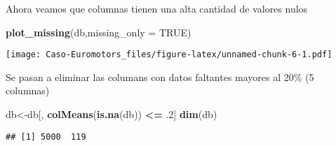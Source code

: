 \documentclass[
]{article}
\newenvironment{Shaded}{\begin{snugshade}}{\end{snugshade}}
\newcommand{\DataTypeTok}[1]{\textcolor[rgb]{0.13,0.29,0.53}{#1}}
\newcommand{\DecValTok}[1]{\textcolor[rgb]{0.00,0.00,0.81}{#1}}
\newcommand{\FloatTok}[1]{\textcolor[rgb]{0.00,0.00,0.81}{#1}}
\newcommand{\KeywordTok}[1]{\textcolor[rgb]{0.13,0.29,0.53}{\textbf{#1}}}
\newcommand{\NormalTok}[1]{#1}
\newcommand{\OperatorTok}[1]{\textcolor[rgb]{0.81,0.36,0.00}{\textbf{#1}}}
\newcommand{\OtherTok}[1]{\textcolor[rgb]{0.56,0.35,0.01}{#1}}
\newcommand{\StringTok}[1]{\textcolor[rgb]{0.31,0.60,0.02}{#1}}
\begin{document}
\begin{Shaded}
\end{Shaded}

Ahora veamos que columnas tienen una alta cantidad de valores nulos

\begin{Shaded}
\begin{Highlighting}[]
\KeywordTok{plot_missing}\NormalTok{(db,}\DataTypeTok{missing_only =} \OtherTok{TRUE}\NormalTok{)}
\end{Highlighting}
\end{Shaded}

\texttt{[image: Caso-Euromotors\_files/figure-latex/unnamed-chunk-6-1.pdf]}

Se pasan a eliminar las columans con datos faltantes mayores al 20\% (5
columnas)

\begin{Shaded}
\begin{Highlighting}[]
\NormalTok{db<-db[, }\KeywordTok{colMeans}\NormalTok{(}\KeywordTok{is.na}\NormalTok{(db)) }\OperatorTok{<=}\StringTok{ }\FloatTok{.2}\NormalTok{]}
\KeywordTok{dim}\NormalTok{(db)}
\end{Highlighting}
\end{Shaded}

\begin{verbatim}
## [1] 5000  119
\end{verbatim}
\end{document}
